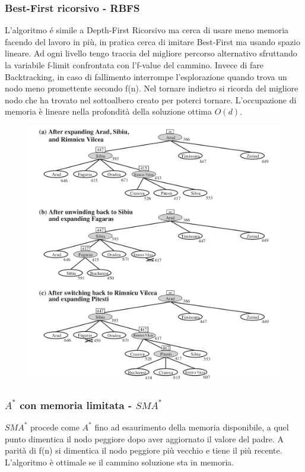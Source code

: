 \documentclass{article}
\begin{document}
\subsubsection{Best-First ricorsivo - RBFS}
L'algoritmo é simile a Depth-First Ricorsivo ma cerca di usare meno memoria facendo del lavoro in più, in pratica cerca di imitare Best-First ma usando spazio lineare. Ad ogni livello tengo traccia del migliore percorso alternativo sfruttando la variabile f-limit confrontata con l'f-value del cammino. Invece di fare Backtracking, in caso di fallimento interrompe l'esplorazione quando trova un nodo meno promettente secondo f(n). Nel tornare indietro si ricorda del migliore nodo che ha trovato nel sottoalbero creato per poterci tornare. L'occupazione di memoria è lineare nella profondità della soluzione ottima $O(d)$.
\begin{figure}[H]
    \centering
    \includegraphics[scale=0.55]{Images/rbfsalg.png}
\end{figure}

\subsubsection{$A^*$ con memoria limitata - $SMA^*$}
$SMA^*$ procede come $A^*$ fino ad esaurimento della memoria disponibile, a quel punto dimentica il nodo peggiore dopo aver aggiornato il valore del padre. A parità di f(n) si dimentica il nodo peggiore più vecchio e tiene il più recente. L'algoritmo è ottimale se il cammino soluzione sta in memoria.
\end{document}
